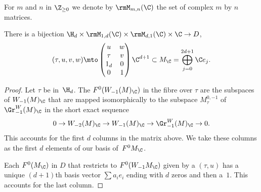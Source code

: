 For $m$ and $n$ in $\Z_{\geq0}$ we denote by $\rmM_{m,n}(\C)$ the set
of complex $m$ by $n$ matrices.

\begin{Proposition}\label{prop:paramD}
There is a bijection
$\H_d\times \rmM_{1,d}(\C) \times \rmM_{d,1}(\C)\times \C \to D$,
\[
(\tau,u,v,w)\mto
\begin{pmatrix}
u & w\\ \tau & v \\ 1_d & 0\\ 0 & 1
\end{pmatrix}
\C^{d+1} \subset M_\C=\bigoplus_{j=0}^{2d+1}\C e_j.
\]
\end{Proposition}
\begin{proof}
Let $\tau$ be in~$\H_d$. The $F^0(W_{-1}(M)_\C)$ in the fibre over
$\tau$ are the subspaces of $W_{-1}(M)_\C$
that are mapped isomorphically to the subspace $M^{0,-1}_\tau$
of~$\Gr^W_{-1}(M)_\C$ in the short exact sequence
\[
0 \to W_{-2}(M)_\C \to W_{-1}(M)_\C \to \Gr^W_{-1}(M)_\C \to 0.
\]
This accounts for the first $d$ columns in the matrix above. We take these
columns as the first $d$ elements of our basis of~$F^0M_\C$.

Each $F^0(M_\C)$ in $D$ that restricts to $F^0(W_{-1}M_\C)$ given by
a $(\tau,u)$ has a unique $(d{+}1)$th basis vector
$\sum a_i e_i$ ending with $d$ zeros and then a~$1$. This accounts for
the last column.
\end{proof}

